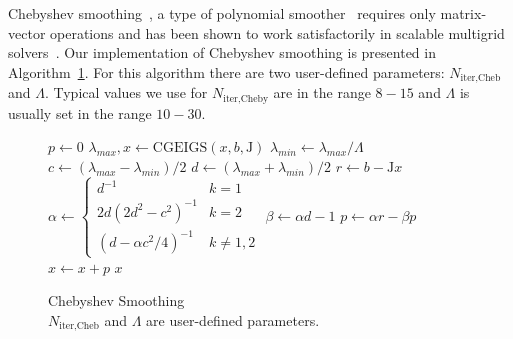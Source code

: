 Chebyshev smoothing~\cite{li2011chebyshev}, a type of polynomial
smoother~\cite{saad2003iterative}
requires only matrix-vector operations and has been shown to work
satisfactorily in scalable multigrid
solvers~\cite{ghysels2012improving}.  Our implementation of
Chebyshev smoothing \cite{li2011chebyshev} is presented in
Algorithm~\ref{alg:Chebyshev_Smoother}. For this algorithm there are two user-defined parameters: $N_\text{iter,Cheb}$ and $\Lambda$. Typical values we use for $N_\text{iter,Cheby}$ are in the range $8-15$ and $\Lambda$ is usually set in the range $10-30$.
%
%
\begin{figure}
  \begin{algorithm}[H]
    \caption{Chebyshev Smoothing\\ $N_\text{iter,Cheb}$ and $\Lambda$ are user-defined parameters.
}\label{alg:Chebyshev_Smoother}
    \begin{algorithmic}[1]
      \State $p \leftarrow 0$
      \State  $\lambda_{max}, x \leftarrow \text{CGEIGS}(x,b,\mathrm{J})$
      \State $\lambda_{min} \leftarrow \lambda_{max}/\Lambda$
      \State $c \leftarrow (\lambda_{max} - \lambda_{min})/2$
      \State $d \leftarrow (\lambda_{max} + \lambda_{min})/2$
      \State $r \leftarrow b - \mathrm{J}x$
\State  $\alpha \leftarrow 
  \begin{cases}
  d^{-1} & k = 1\\
  2d(2d^2-c^2)^{-1} & k = 2\\
  (d - \alpha c^2/4)^{-1} & k \neq 1,2
  \end{cases}
  $\;
  \State $\beta \leftarrow \alpha d - 1$
  \State $p \leftarrow \alpha r - \beta p$
  \State $x \leftarrow x + p$
  \EndFor
  \State \Return $x$
      \EndFunction
    \end{algorithmic}
  \end{algorithm}
\end{figure}
